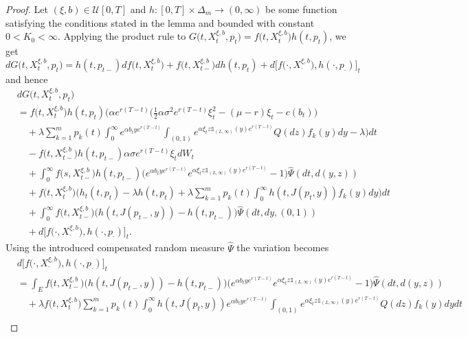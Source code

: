 \documentclass[reqno, 11pt]{amsart}%
\newcommand{\xib}{(\xi,b)}
\theoremstyle{definition}
\numberwithin{equation}{section} \numberwithin{theorem}{section}
\begin{document}
\begin{proof}
	 Let $\xib\in \mathcal U[0,T]$ and $h:[0,T]\times\Delta_m\to(0,\infty)$ be some function satisfying the conditions stated in the lemma and bounded with constant $0<K_0<\infty$. Applying the product rule  to $G\big(t,X^{\xi,b}_t,p_t\big)=f\big(t,X^{\xi,b}_t\big)h(t,p_t)$, we get
	\begin{equation*}
	d G\big(t,X^{\xi,b}_t,p_t\big) 
	= h(t,p_{t-})df\big(t,X^{\xi,b}_t\big) + f\big(t,X^{\xi,b}_{t-}\big) d h(t,p_t)  + d\big[f\big(\cdot,X^{\xi,b}_\cdot\big),h(\cdot,p_\cdot)\big]_t 
	\end{equation*}
	and hence
	\begin{equation}\label{G}
	\begin{aligned}
	&d G\big(t,X^{\xi,b}_t,p_t\big) \\
	&= f\big(t,X^{\xi,b}_t\big)h(t,p_t)\bigg(\alpha e^{r(T-t)}\Big(\frac12\alpha\sigma^2 e^{r(T-t)}\xi_t^2 - (\mu-r)\xi_t - c(b_t)\Big) \\
	&\quad + \lambda\sum_{k=1}^m p_k(t)\int_0^\infty e^{\alpha b_t y e^{r(T-t)}}\int_{(0,1)}\!e^{\alpha \xi_t z \mathds{1}_{(L,\infty)}(y)e^{r(T-t)}}Q(dz)f_k(y)dy - \lambda\bigg)dt \\
	&\quad-f\big(t,X^{\xi,b}_{t-}\big) h(t,p_{t-}) \alpha\sigma e^{r(T-t)} \xi_tdW_t \\
   &\quad+\int_0^\infty f\big(s,X^{\xi,b}_{t-}\big)h(t,p_{t-})\big(e^{\alpha b_t y e^{r(T-t)}}e^{\alpha \xi_t z \mathds{1}_{(L,\infty)}(y) e^{r(T-t)}}-1\big)\hat\Psi(dt,d(y,z)) \\
	&\quad+f\big(t,X^{\xi,b}_{t}\big) \bigg(h_t(t,p_t) - \lambda h(t,p_t) + \lambda\sum_{k=1}^m p_k(t)\int_0^\infty h(t,J(p_t,y))f_k(y)dy\bigg)dt \\
	&\quad+\int_0^\infty f\big(t,X^{\xi,b}_{t-}\big)\big(h(t,J(p_{t-},y))-h(t,p_{t-})\big)\hat{\Psi}(dt,dy,(0,1)) \\
	&\quad + d\big[f\big(\cdot,X^{\xi,b}_\cdot\big),h(\cdot,p_\cdot)\big]_t.
	\end{aligned}
	\end{equation}
Using the introduced compensated random measure $\hat{\Psi}$ the variation becomes
\begin{align*}
&d\big[f\big(\cdot,X^{\xi,b}_\cdot\big),h(\cdot,p_\cdot)\big]_t \\
&= \int_E f\big(t,X^{\xi,b}_{t-}\big)\big(h(t,J(p_{t-},y))-h(t,p_{t-})\big)\Big(e^{\alpha b_t y e^{r(T-t)}}e^{\alpha \xi_t z \mathds{1}_{(L,\infty)}(y) e^{r(T-t)}} -1\Big)\hat{\Psi}(dt, d(y,z)) \\
&\quad + \lambda f\big(t,X_t^{\xi,b}\big)\sum_{k=1}^m p_k(t) \int_0^\infty h(t,J(p_t,y))e^{\alpha b_t y e^{r(T-t)}}\int_{(0,1)}\!e^{\alpha \xi_t z \mathds{1}_{(L,\infty)}(y)e^{r(T-t)}}Q(dz)f_k(y)dydt \\

\end{align*}
\end{proof}
\end{document}
